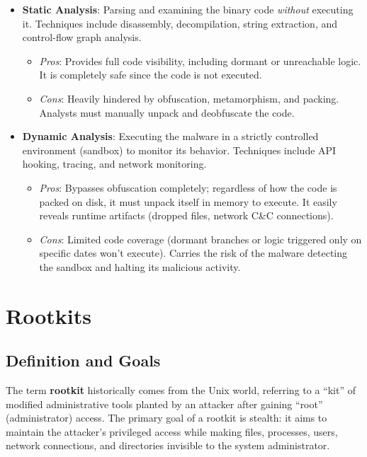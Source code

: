\begin{itemize}
    \item \textbf{Static Analysis}: Parsing and examining the binary code \textit{without} executing it. Techniques include disassembly, decompilation, string extraction, and control-flow graph analysis.
    \begin{itemize}
        \item \textit{Pros}: Provides full code visibility, including dormant or unreachable logic. It is completely safe since the code is not executed.
        \item \textit{Cons}: Heavily hindered by obfuscation, metamorphism, and packing. Analysts must manually unpack and deobfuscate the code.
    \end{itemize}
    \item \textbf{Dynamic Analysis}: Executing the malware in a strictly controlled environment (sandbox) to monitor its behavior. Techniques include API hooking, tracing, and network monitoring.
    \begin{itemize}
        \item \textit{Pros}: Bypasses obfuscation completely; regardless of how the code is packed on disk, it must unpack itself in memory to execute. It easily reveals runtime artifacts (dropped files, network C\&C connections).
        \item \textit{Cons}: Limited code coverage (dormant branches or logic triggered only on specific dates won't execute). Carries the risk of the malware detecting the sandbox and halting its malicious activity.
    \end{itemize}
\end{itemize}

\section{Rootkits}

\subsection{Definition and Goals}
The term \textbf{rootkit} historically comes from the Unix world, referring to a ``kit'' of modified administrative tools planted by an attacker after gaining ``root'' (administrator) access. The primary goal of a rootkit is stealth: it aims to maintain the attacker's privileged access while making files, processes, users, network connections, and directories invisible to the system administrator.

